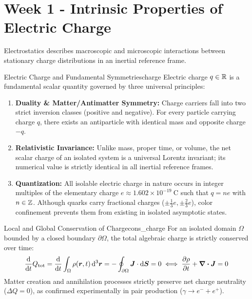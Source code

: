 \newcommand{\sepr}{\bm{r} - \bm{r}'}
\newcommand{\seprmag}{\|\bm{r} - \bm{r}'\|}
\newcommand{\uvec}[1]{\hat{\bm{#1}}}


\vspace{1.5em}

\section{Week 1 - Intrinsic Properties of Electric Charge }

Electrostatics describes macroscopic and microscopic interactions between stationary charge distributions in an inertial reference frame.

\begin{definition}{Electric Charge and Fundamental Symmetries}{charge}
Electric charge $q \in \mathbb{R}$ is a fundamental scalar quantity governed by three universal principles:
\begin{enumerate}
    \item \textbf{Duality \& Matter/Antimatter Symmetry:} Charge carriers fall into two strict inversion classes (positive and negative). For every particle carrying charge $q$, there exists an antiparticle with identical mass and opposite charge $-q$.
    \item \textbf{Relativistic Invariance:} Unlike mass, proper time, or volume, the net scalar charge of an isolated system is a universal Lorentz invariant; its numerical value is strictly identical in all inertial reference frames.
    \item \textbf{Quantization:} All isolable electric charge in nature occurs in integer multiples of the elementary charge $e \approx 1.602 \times 10^{-19}\ \text{C}$ such that $q = n e$ with $n \in \mathbb{Z}$. Although quarks carry fractional charges ($\pm \frac{1}{3}e, \pm \frac{2}{3}e$), color confinement prevents them from existing in isolated asymptotic states.
\end{enumerate}
\end{definition}

\begin{theorem}{Local and Global Conservation of Charge}{cons_charge}
For an isolated domain $\Omega$ bounded by a closed boundary $\partial\Omega$, the total algebraic charge is strictly conserved over time:
\begin{equation}
    \dv{t} Q_{\text{tot}} = \dv{t} \int_{\Omega} \rho(\bm{r}, t)\,\dd^3\bm{r} = -\oint_{\partial\Omega} \bm{J}\cdot\dd\bm{S} = 0 \iff \pdv{\rho}{t} + \div\bm{J} = 0
\end{equation}
Matter creation and annihilation processes strictly preserve net charge neutrality ($\Delta Q = 0$), as confirmed experimentally in pair production ($\gamma \to e^- + e^+$).
\end{theorem}

